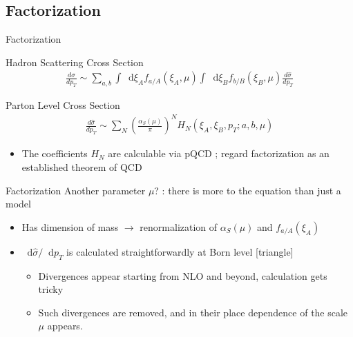 \documentclass[aspectratio=169,xcolor=dvipsnames]{beamer}
\newcommand{\dder}[2]{\frac{d#1}{d#2}}
\newcommand*\dif{\mathop{}\!\mathrm{d}}
\begin{document}
\subsection{Factorization}
\begin{frame}{Factorization}
	\begin{block}{Hadron Scattering Cross Section}
		\centering
		\begin{align*}
			\dder{\sigma}{p_T} \sim \sum_{a,b}\int \dif \xi_A f_{a/A}(\xi_A,\mu) \int  \dif \xi_B f_{b/B}(\xi_B,\mu) \dder{\hat{\sigma}}{p_T}
		\end{align*}
	\end{block}

	\begin{block}{Parton Level Cross Section}
		\centering
		\begin{align*}
			 \dder{\hat{\sigma}}{p_T} \sim \sum_N \left( \frac{\alpha_S(\mu)}{\pi} \right)^N H_N\left(\xi_A,\xi_B,p_T;a,b,\mu\right)
		\end{align*}
	\end{block}\vskip0.15in

	\begin{itemize}
		\item The coefficients $H_N$ are calculable via pQCD ; regard factorization as an established theorem of QCD
	\end{itemize}
\end{frame}

\begin{frame}{Factorization}
	Another parameter $\mu$? : there is more to the equation than just a model\vskip0.15in
	\begin{itemize}
		\item Has dimension of mass $\to$ renormalization of $\alpha_S(\mu)$ and $f_{a/A}(\xi_A)$
		\item $\dif \hat{\sigma} / \dif p_T$ is calculated straightforwardly at Born level\vskip0.075in
		[triangle]
		\begin{itemize}
			\item Divergences appear starting from NLO and beyond, calculation gets tricky\vskip0.05in
			\item Such divergences are removed, and in their place dependence of the scale $\mu$ appears.
		\end{itemize}
	\end{itemize}
\end{frame}
\end{document}
